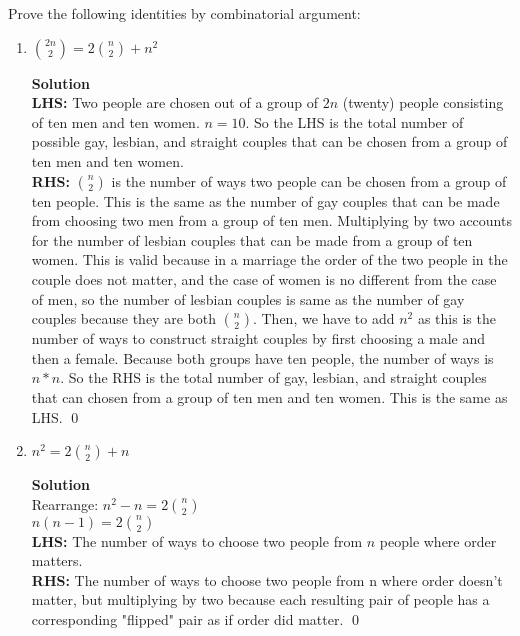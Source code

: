 \documentclass[11pt]{article}
\newenvironment{Parts}{\begin{enumerate}[label=(\alph*)]}{\end{enumerate}}
\newcommand*{\Part}{\item}
\begin{document}
\newcommand{\sblank}{\vspace{1in}}
Prove the following identities by combinatorial argument:
\begin{Parts}
\Part $\binom{2n}{2} = 2 \binom{n}{2} + n^2$
\begin{mdframed} \textbf{Solution} \\
\textbf{LHS: }Two people are chosen out of a group of $2n$ (twenty) people consisting of ten men and ten women. $n=10$. So the LHS is the total number of possible gay, lesbian, and straight couples that can be chosen from a group of ten men and ten women. \\
\textbf{RHS: }$\binom{n}{2}$ is the number of ways two people can be chosen from a group of ten people. This is the same as the number of gay couples that can be made from choosing two men from a group of ten men. Multiplying by two accounts for the number of lesbian couples that can be made from a group of ten women. This is valid because in a marriage the order of the two people in the couple does not matter, and the case of women is no different from the case of men, so the number of lesbian couples is same as the number of gay couples because they are both $\binom{n}{2}$. Then, we have to add $n^2$ as this is the number of ways to construct straight couples by first choosing a male and then a female. Because both groups have ten people, the number of ways is $n*n$. So the RHS is the total number of gay, lesbian, and straight couples that can chosen from a group of ten men and ten women. This is the same as LHS. \qed
\end{mdframed}

\Part $n^2 = 2 \binom{n}{2} + n$
\begin{mdframed} \textbf{Solution} \\
Rearrange: $n^2-n=2\binom{n}{2}$ \\
$n(n-1)=2\binom{n}{2}$ \\
\textbf{LHS: }The number of ways to choose two people from $n$ people where order matters. \\
\textbf{RHS: }The number of ways to choose two people from n where order doesn't matter, but multiplying by two because each resulting pair of people has a corresponding "flipped" pair as if order did matter. \qed
\end{mdframed}


\end{Parts}
\end{document}

